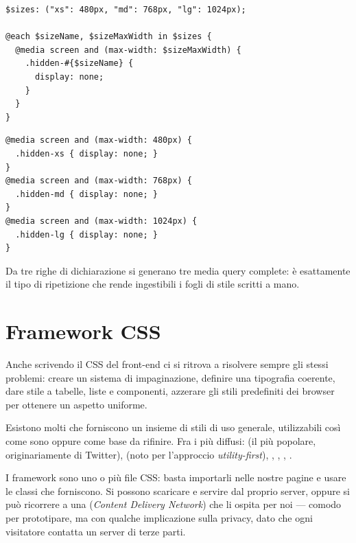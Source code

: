 \begin{affianco}[0.52]
\begin{lstlisting}[style=css, name=hidden.scss]
$sizes: ("xs": 480px, "md": 768px, "lg": 1024px);

@each $sizeName, $sizeMaxWidth in $sizes {
  @media screen and (max-width: $sizeMaxWidth) {
    .hidden-#{$sizeName} {
      display: none;
    }
  }
}
\end{lstlisting}
\risultato
\begin{lstlisting}[style=css, name=CSS generato]
@media screen and (max-width: 480px) {
  .hidden-xs { display: none; }
}
@media screen and (max-width: 768px) {
  .hidden-md { display: none; }
}
@media screen and (max-width: 1024px) {
  .hidden-lg { display: none; }
}
\end{lstlisting}
\end{affianco}

Da tre righe di dichiarazione si generano tre media query complete: è
esattamente il tipo di ripetizione che rende ingestibili i fogli di stile
scritti a mano.

\section{Framework CSS}

Anche scrivendo il CSS del front-end ci si ritrova a risolvere sempre gli stessi
problemi: creare un sistema di impaginazione, definire una tipografia coerente,
dare stile a tabelle, liste e componenti, azzerare gli stili predefiniti dei
browser per ottenere un aspetto uniforme.

Esistono molti  che forniscono un insieme di stili di uso
generale, utilizzabili così come sono oppure come base da rifinire. Fra i più
diffusi:  (il più popolare, originariamente di Twitter),
 (noto per l'approccio \textit{utility-first}),
, , , .


I framework sono uno o più file CSS: basta importarli nelle nostre pagine e
usare le classi che forniscono. Si possono scaricare e servire dal proprio
server, oppure si può ricorrere a una  (\textit{Content Delivery
Network}) che li ospita per noi --- comodo per prototipare, ma con qualche
implicazione sulla privacy, dato che ogni visitatore contatta un server di terze
parti.

